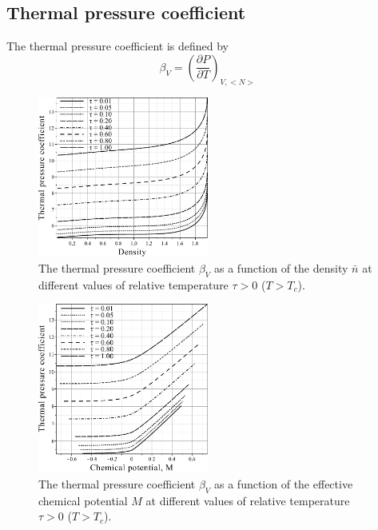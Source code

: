 \documentclass[12pt]{article}
\begin{document}
	\subsection{Thermal pressure coefficient}
	The thermal pressure coefficient is defined by
	\begin{equation}
		\label{def:therm_pres_coef}
		\beta_V = \left( \frac{\partial P}{\partial T} \right)_{V,<N>}
	\end{equation}
	
	\begin{figure}[h!]
		\centering \includegraphics[width=0.5\textwidth]{f3a.pdf}
		\vskip-3mm\caption{The thermal pressure coefficient $\beta_V$ as a function of the density $\bar n$ at different values of relative temperature $\tau > 0$ ($T > T_c$). 
		}\label{fig3a}
	\end{figure}
	\begin{figure}[h!]
		\centering \includegraphics[width=0.5\textwidth]{f3b.pdf}
		\vskip-3mm\caption{The thermal pressure coefficient $\beta_V$ as a function of the effective chemical potential $M$ at different values of relative temperature $\tau > 0$ ($T > T_c$). 
		}\label{fig3b}
	\end{figure}
\end{document}
